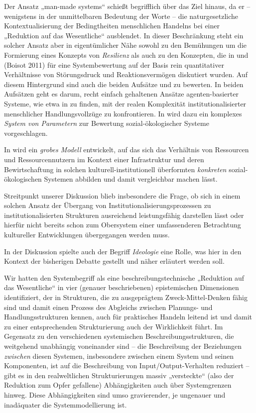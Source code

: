 \documentclass[11pt,a4paper]{article}
\begin{document}
Der Ansatz „man-made systems“ schießt begriff\-lich über das Ziel hinaus, da
er -- wenigstens in der unmittelbaren Bedeutung der Worte -- die
naturgesetzliche Kontextualisierung der Bedingtheiten menschlichen Handelns
bei einer „Reduktion auf das Wesentliche“ ausblendet. In dieser Beschränkung
steht ein solcher Ansatz aber in eigentümlicher Nähe sowohl zu den Bemühungen
um die Formierung eines Konzepts von \emph{Resilienz} als auch zu den
Konzepten, die in \cite{Ashby1958} und (Boisot 2011) für eine Systembewertung
auf der Basis rein quantitativer Verhältnisse von Störungsdruck und
Reaktionsvermögen diskutiert wurden.  Auf diesem Hintergrund sind auch die
beiden Aufsätze \cite{Ostrom2007} und \cite{Anderies2004} zu bewerten. In
beiden Aufsätzen geht es darum, recht einfach gehaltenen Ansätze
agenten-basierter Systeme, wie etwa in \cite{Holland2006} zu finden, mit der
realen Komplexität institutionalisierter menschlicher Handlungsvollzüge zu
konfrontieren.  In \cite{Ostrom2007} wird dazu ein komplexes \emph{System von
  Parametern} zur Bewertung sozial-ökologischer Systeme vorgeschlagen.

In \cite{Anderies2004} wird ein \emph{grobes Modell} entwickelt, auf das sich
das Verhältnis von Ressourcen und Ressourcennutzern im Kontext einer
Infrastruktur und deren Bewirtschaftung in solchen kulturell-institutionell
überformten \emph{konkreten} sozial-ökologischen Systemen abbilden und damit
vergleichbar machen lässt.

Streitpunkt unserer Diskussion blieb insbesondere die Frage, ob sich in einem
solchen Ansatz der Übergang von Institutionalisierungsprozessen zu
institutionalisierten Strukturen ausreichend leistungsfähig darstellen lässt
oder hierfür nicht bereits schon zum Obersystem einer umfassenderen
Betrachtung kultureller Entwicklungen übergegangen werden muss.

In der Diskussion spielte auch der Begriff \emph{Ideologie} eine Rolle, was
hier in den Kontext der bisherigen Debatte gestellt und näher erläutert werden
soll.

Wir hatten den Systembegriff als eine beschreibungstechnische „Reduktion auf
das Wesentliche“ in vier (genauer beschriebenen) epistemischen Dimensionen
identifiziert, der in Strukturen, die zu ausgeprägtem Zweck-Mittel-Denken
fähig sind und damit einen Prozess des Abgleichs zwischen Planungs- und
Handlungsstrukturen kennen, auch für praktisches Handeln leitend ist und damit
zu einer entsprechenden Strukturierung auch der Wirklichkeit führt. Im
Gegensatz zu den verschiedenen systemischen Beschreibungsstrukturen, die
weitgehend unabhängig voneinander sind -- die Beschreibung der Beziehungen
\emph{zwischen} diesen Systemen, insbesondere zwischen einem System und seinen
Komponenten, ist auf die Beschreibung von Input/Output-Verhalten reduziert --
gibt es in den realweltlichen Strukturierungen massiv „versteckte“ (also der
Reduktion zum Opfer gefallene) Abhängigkeiten auch über Systemgrenzen hinweg.
Diese Abhängigkeiten sind umso gravierender, je ungenauer und inadäquater die
Systemmodellierung ist.
\end{document}
